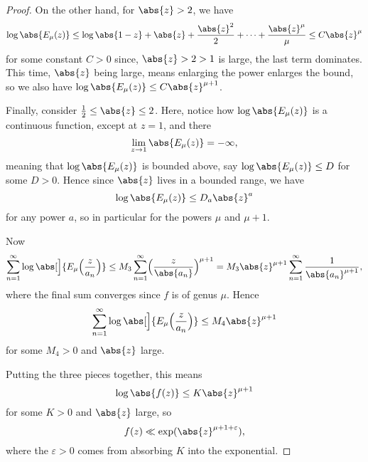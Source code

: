\begin{proof}
	On the other hand, for $\abs{z} > 2$, we have
	\[
		\log \abs{E_\mu(z)} \leq \log\abs{1 - z} + \abs{z} + \frac{\abs{z}^2}{2} + \dots + \frac{\abs{z}^\mu}{\mu} \leq C \abs{z}^\mu
	\]
	for some constant $C > 0$ since, $\abs{z} > 2 > 1$ is large, the last term dominates.
	This time, $\abs{z}$ being large, means enlarging the power enlarges the bound, so we also have $\log \abs{E_\mu(z)} \leq C \abs{z}^{\mu + 1}$.

	Finally, consider $\frac{1}{2} \leq \abs{z} \leq 2$.
	Here, notice how $\log\abs{E_\mu(z)}$ is a continuous function, except at $z = 1$, and there
	\[
		\lim_{z \to 1} \abs{E_\mu(z)} = -\infty,
	\]
	meaning that $\log \abs{E_\mu(z)}$ is bounded above, say $\log\abs{E_\mu(z)} \leq D$ for some $D > 0$.
	Hence since $\abs{z}$ lives in a bounded range, we have
	\[
		\log\abs{E_\mu(z)} \leq D_a \abs{z}^a
	\]
	for any power $a$, so in particular for the powers $\mu$ and $\mu + 1$.


	Now
	\[
		\sum_{n = 1}^\infty \log \abs[\Big]{E_\mu\Bigl( \frac{z}{a_n} \Bigr )} \leq M_3 \sum_{n = 1}^\infty \Bigl( \frac{z}{\abs{a_n}} \Bigr)^{\mu + 1} = M_3 \abs{z}^{\mu + 1} \sum_{n = 1}^\infty \frac{1}{\abs{a_n}^{\mu + 1}},
	\]
	where the final sum converges since $f$ is of genus $\mu$.
	Hence
	\[
		\sum_{n = 1}^\infty \log \abs[\Big]{E_\mu\Bigl( \frac{z}{a_n} \Bigr )} \leq M_4 \abs{z}^{\mu + 1}
	\]
	for some $M_4 > 0$ and $\abs{z}$ large.

	Putting the three pieces together, this means
	\[
		\log \abs{f(z)} \leq K \abs{z}^{\mu + 1}
	\]
	for some $K > 0$ and $\abs{z}$ large, so
	\[
		f(z) \ll \exp(\abs{z}^{\mu + 1 + \varepsilon}),
	\]
	where the $\varepsilon > 0$ comes from absorbing $K$ into the exponential.
\end{proof}
